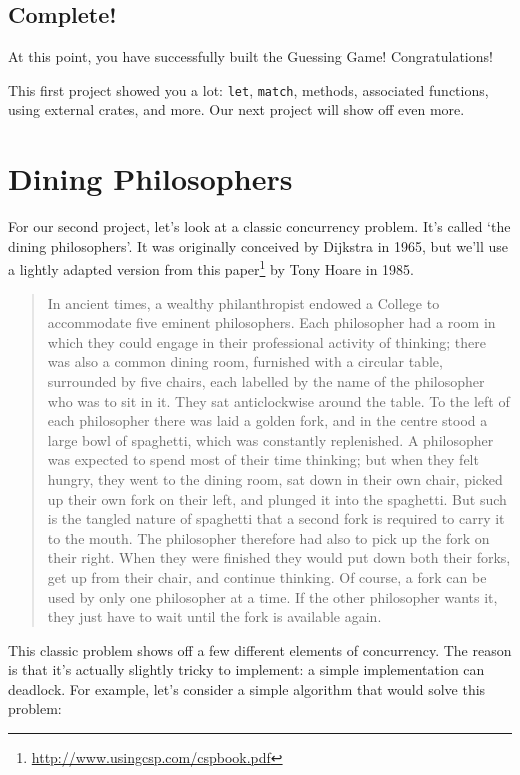 \documentclass[a4paper,]{book}
\renewcommand{\href}[2]{#2\footnote{\url{#1}}}
\begin{document}
\subsection{Complete!}\label{complete}

At this point, you have successfully built the Guessing Game!
Congratulations!

This first project showed you a lot: \texttt{let}, \texttt{match},
methods, associated functions, using external crates, and more. Our next
project will show off even more.

\section{Dining Philosophers}\label{sec--dining-philosophers}

For our second project, let's look at a classic concurrency problem.
It's called `the dining philosophers'. It was originally conceived by
Dijkstra in 1965, but we'll use a lightly adapted version from
\href{http://www.usingcsp.com/cspbook.pdf}{this paper} by Tony Hoare in
1985.

\begin{quote}
In ancient times, a wealthy philanthropist endowed a College to
accommodate five eminent philosophers. Each philosopher had a room in
which they could engage in their professional activity of thinking;
there was also a common dining room, furnished with a circular table,
surrounded by five chairs, each labelled by the name of the philosopher
who was to sit in it. They sat anticlockwise around the table. To the
left of each philosopher there was laid a golden fork, and in the centre
stood a large bowl of spaghetti, which was constantly replenished. A
philosopher was expected to spend most of their time thinking; but when
they felt hungry, they went to the dining room, sat down in their own
chair, picked up their own fork on their left, and plunged it into the
spaghetti. But such is the tangled nature of spaghetti that a second
fork is required to carry it to the mouth. The philosopher therefore had
also to pick up the fork on their right. When they were finished they
would put down both their forks, get up from their chair, and continue
thinking. Of course, a fork can be used by only one philosopher at a
time. If the other philosopher wants it, they just have to wait until
the fork is available again.
\end{quote}

This classic problem shows off a few different elements of concurrency.
The reason is that it's actually slightly tricky to implement: a simple
implementation can deadlock. For example, let's consider a simple
algorithm that would solve this problem:
\end{document}
